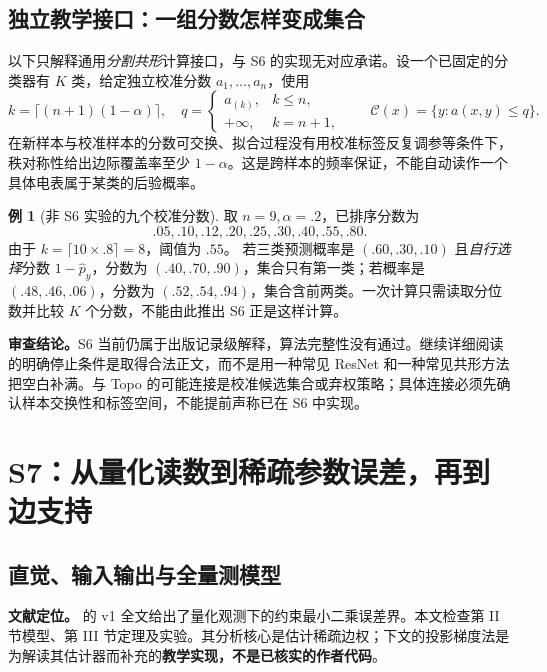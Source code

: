 \documentclass[UTF8,11pt,fontset=fandol,openany,oneside]{ctexbook}
\theoremstyle{definition}
\newtheorem{example}[theorem]{例}
\theoremstyle{remark}
\numberwithin{equation}{chapter}
\begin{document}
\subsection{独立教学接口：一组分数怎样变成集合}

以下只解释通用\emph{分割共形}计算接口，与 S6 的实现无对应承诺。设一个已固定的分类器有 $K$ 类，给定独立校准分数 $a_1,\ldots,a_n$，使用
\begin{equation}
 k=\lceil(n+1)(1-\alpha)\rceil,\quad
 q=\begin{cases}a_{(k)},&k\le n,\\+\infty,&k=n+1,\end{cases}
 \qquad \mathcal C(x)=\{y:a(x,y)\le q\}.
 \label{eq:dq_generic_cp}
\end{equation}
在新样本与校准样本的分数可交换、拟合过程没有用校准标签反复调参等条件下，秩对称性给出边际覆盖率至少 $1-\alpha$。这是跨样本的频率保证，不能自动读作一个具体电表属于某类的后验概率。

\begin{example}[非 S6 实验的九个校准分数]
取 $n=9,\alpha=.2$，已排序分数为
\[.05,.10,.12,.20,.25,.30,.40,.55,.80.\]
由于 $k=\lceil10\times.8\rceil=8$，阈值为 $.55$。
若三类预测概率是 $(.60,.30,.10)$ 且\emph{自行选择}分数 $1-\hat p_y$，分数为 $(.40,.70,.90)$，集合只有第一类；若概率是 $(.48,.46,.06)$，分数为 $(.52,.54,.94)$，集合含前两类。一次计算只需读取分位数并比较 $K$ 个分数，不能由此推出 S6 正是这样计算。
\end{example}

\textbf{审查结论。}S6 当前仍属于出版记录级解释，算法完整性没有通过。继续详细阅读的明确停止条件是取得合法正文，而不是用一种常见 ResNet 和一种常见共形方法把空白补满。与 Topo 的可能连接是校准候选集合或弃权策略；具体连接必须先确认样本交换性和标签空间，不能提前声称已在 S6 中实现。

\section{S7：从量化读数到稀疏参数误差，再到边支持}
\label{sec:dq_s7}

\subsection{直觉、输入输出与全量测模型}

\textbf{文献定位。}\citet{S7} 的 v1 全文给出了量化观测下的约束最小二乘误差界。本文检查第 II 节模型、第 III 节定理及实验。其分析核心是估计稀疏边权；下文的投影梯度法是为解读其估计器而补充的\textbf{教学实现，不是已核实的作者代码}。
\end{document}
